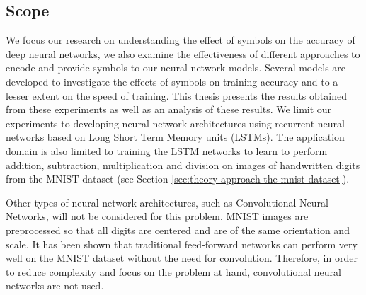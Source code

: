 \subsection{Scope} \label{sec:introduction-research-objective-scope-scope}

We focus our research on understanding the effect of symbols on the accuracy of deep neural networks, we also examine the effectiveness of different approaches to encode and provide symbols to our neural network models. Several models are developed to investigate the effects of symbols on training accuracy and to a lesser extent on the speed of training. This thesis presents the results obtained from these experiments as well as an analysis of these results. We limit our experiments to developing neural network architectures using recurrent neural networks based on Long Short Term Memory units (LSTMs). The application domain is also limited to training the LSTM networks to learn to perform addition, subtraction, multiplication and division on images of handwritten digits from the MNIST dataset (see Section \ref{sec:theory-approach-the-mnist-dataset}).

Other types of neural network architectures, such as Convolutional Neural Networks, will not be considered for this problem. MNIST images are preprocessed so that all digits are centered and are of the same orientation and scale. It has been shown that traditional feed-forward networks can perform very well on the MNIST dataset without the need for convolution. Therefore, in order to reduce complexity and focus on the problem at hand, convolutional neural networks are not used. 